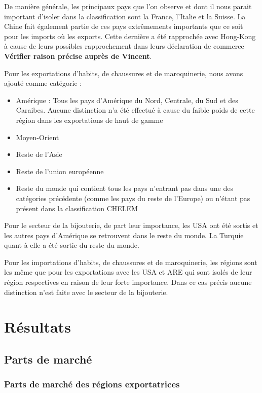\documentclass[french,10pt,a4paper]{article}
\begin{document}
De manière générale, les principaux pays que l'on observe et dont il nous parait important d'isoler dans la classification sont la France, l'Italie et la Suisse. La Chine fait également partie de ces pays extrêmements importants que ce soit pour les imports où les exports. Cette dernière a été rapprochée avec Hong-Kong à cause de leurs possibles rapprochement dans leurs déclaration de commerce \textbf{Vérifier raison précise auprès de Vincent}.

Pour les exportations d'habits, de chaussures et de maroquinerie, nous avons ajouté comme catégorie :

\begin{itemize}
  \item Amérique : Tous les pays d'Amérique du Nord, Centrale, du Sud et des Caraibes. Aucune distinction n'a été effectué à cause du faible poids de cette région dans les exportations de haut de gamme
  \item Moyen-Orient
  \item Reste de l'Asie
  \item Reste de l'union européenne
  \item Reste du monde qui contient tous les pays n'entrant pas dans une des catégories précédente (comme les pays du reste de l'Europe) ou n'étant pas présent dans la classification CHELEM
\end{itemize}

Pour le secteur de la bijouterie, de part leur importance, les USA ont été sortis et les autres pays d'Amérique se retrouvent dans le reste du monde. La Turquie quant à elle a été sortie du reste du monde.

Pour les importations d'habits, de chaussures et de maroquinerie, les régions sont les même que pour les exportations avec les USA et ARE qui sont isolés de leur région respectives en raison de leur forte importance. Dans ce cas précis aucune distinction n'est faite avec le secteur de la bijouterie.

\section{Résultats}

\subsection{Parts de marché}

\subsubsection{Parts de marché des régions exportatrices}
\end{document}
